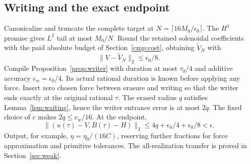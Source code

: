 \documentclass[11pt,a4paper]{amsart}
\theoremstyle{definition}
\theoremstyle{remark}
\numberwithin{equation}{section}
\newcommand{\norm}[1]{\lVert #1\rVert}
\begin{document}
\subsection{Writing and the exact endpoint}
Canonicalize and truncate the complete target at
$N=\lceil16M_0/\epsilon_0\rceil$. The $H^1$ promise gives $L^2$ tail at most $M_0/N$. Round the retained solenoidal coefficients with the paid absolute budget of Section~\ref{cmp:cost}, obtaining $\widetilde V_N$ with
\[
 \norm{V-\widetilde V_N}_2\le\epsilon_0/8.
\]
Compile Proposition~\ref{prop:writer} with duration at most $\tau_0/4$ and additive accuracy $e_w=\epsilon_0/4$. Its actual rational duration is known before applying any force. Insert zero chosen force between erasure and writing so that the writer ends exactly at the original rational $\tau$. The erased radius $q$ satisfies Lemma~\ref{lem:waiting}, hence the writer entrance error is at most $2q$. The fixed choice of $c$ makes $2q\le e_w/16$. At the endpoint,
\[
 \norm{(u(\tau)-V,B(\tau)-H)}_2
 \le4q+\epsilon_0/4+\epsilon_0/8<\epsilon.
\]
Output, for example, $\eta=\eta_0/(16C)$, reserving further fractions for force approximation and primitive tolerances. The all-realization transfer is proved in Section~\ref{sec:weak}.
\end{document}
